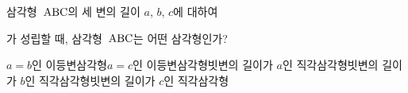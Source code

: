 삼각형~$\mathrm{ABC}$의 세 변의 길이 $a$, $b$, $c$에 대하여 \par\smallskip{}\par\smallskip\noindent 가 성립할 때, 삼각형~$\mathrm{ABC}$는 어떤 삼각형인가? 
\begin{choicesv}{$a=b$인 이등변삼각형}{$a=c$인 이등변삼각형}{빗변의 길이가 $a$인 직각삼각형}{빗변의 길이가 $b$인 직각삼각형}{빗변의 길이가 $c$인 직각삼각형}\end{choicesv}

